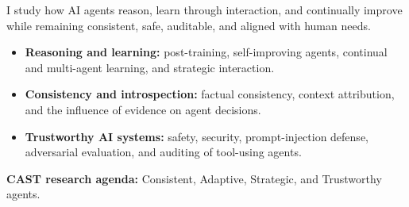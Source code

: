 I study how AI agents reason, learn through interaction, and continually improve while remaining consistent, safe, auditable, and aligned with human needs.
\begin{itemize}
\item \textbf{Reasoning and learning:} post-training, self-improving agents, continual and multi-agent learning, and strategic interaction.
\item \textbf{Consistency and introspection:} factual consistency, context attribution, and the influence of evidence on agent decisions.
\item \textbf{Trustworthy AI systems:} safety, security, prompt-injection defense, adversarial evaluation, and auditing of tool-using agents.
\end{itemize}
\textbf{CAST research agenda:} Consistent, Adaptive, Strategic, and Trustworthy agents.

